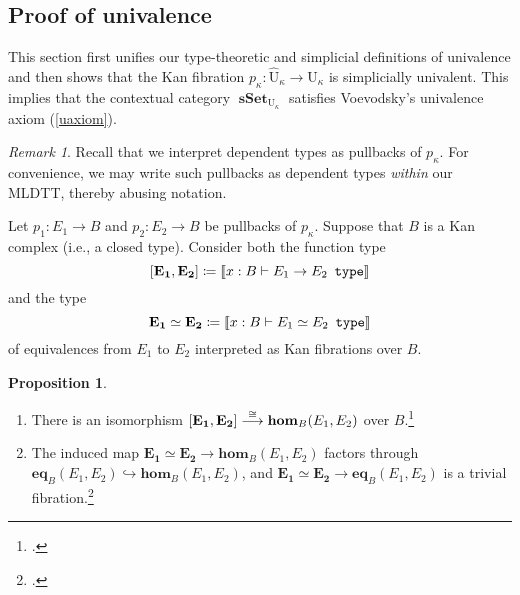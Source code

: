 \documentclass[10pt,letterpaper,cm]{nupset}
\theoremstyle{definition}
\theoremstyle{theorem}
\newtheorem{prop}[definition]{Proposition}
\theoremstyle{remark}
\newtheorem{remark}[definition]{Remark}
\newcommand{\0}{\mathbf{0}}
\newcommand{\1}{\mathbf{1}}
\newcommand{\2}{\mathbf{2}}
\DeclareMathOperator{\type}{\mathtt{type}}
\DeclareMathOperator{\sset}{\mathbf{sSet}}
\newcommand{\be}{\begin{enumerate}}
\newcommand{\ee}{\end{enumerate}}
\begin{document}
\subsection{Proof of univalence}\label{fibunivpf}

This section first unifies our type-theoretic and simplicial definitions of univalence and then shows that the Kan fibration $p_{\kappa} : \widehat{\mathrm{U}}_{\kappa} \to \mathrm{U}_{\kappa}$ is simplicially univalent. This implies that the contextual category $\sset_{\mathrm{U}_{\kappa}}$ satisfies Voevodsky's univalence axiom (\cref{uaxiom}).

\smallskip

\begin{remark}
Recall that we interpret  dependent types as pullbacks of  $p_{\kappa}$. For convenience, we may write such pullbacks as  dependent types \emph{within} our MLDTT, thereby abusing notation.
\end{remark}

\bigskip

Let $p_1:E_1 \to B$ and $p_2 : E_2 \to B$ be pullbacks of $p_{\kappa}$. Suppose that $B$ is a Kan complex (i.e., a closed type). Consider both the function type $$\mathbf{\mleft[E_1, E_2\mright]}\coloneqq  \mleft\llbracket{x: B \vdash {E_1 \to E_2}\ \type}\mright\rrbracket$$ and the type $$\mathbf{E_1 \simeq E_2} \coloneqq  \mleft\llbracket{x: B \vdash {E_1\simeq E_2}\ \type}\mright\rrbracket$$ of equivalences from $E_1$ to $E_2$ interpreted as Kan fibrations over $B$.

\begin{prop}\label{funciso} $ $
\be[label=(\arabic*)]
\item There is an isomorphism $\mathbf{\mleft[E_1, E_2\mright]} \overset{\cong}{\longrightarrow} \mathbf{hom}_B(E_1, E_2)$ over $B$.\footnote{\autocite[Corollary 3.3.3]{KL}.}
\item The induced map $\mathbf{E_1 \simeq E_2} \to  \mathbf{hom}_B(E_1, E_2)$ factors through $\mathbf{eq}_B(E_1,E_2) \hookrightarrow   \mathbf{hom}_B(E_1, E_2)$, and $\mathbf{E_1 \simeq E_2} \to \mathbf{eq}_B(E_1,E_2)$ is a trivial fibration.\footnote{\autocite[Lemma 3.3.4]{KL}.}
\ee
\end{prop}

\smallskip
\end{document}
